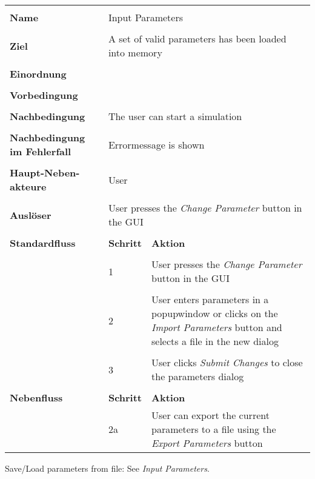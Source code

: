 {\begin{tabular}{|p{5cm}|p{2cm}|p{3cm}|}
\hline \\
\textbf{Name} & \multicolumn{2}{p{5cm}|}{Input Parameters} \\
\hline \\
\textbf{Ziel} & \multicolumn{2}{p{5cm}|}{A set of valid parameters has been loaded into memory} \\
\hline \\
\textbf{Einordnung} & \multicolumn{2}{p{5cm}|}{} \\
\hline \\
\textbf{Vorbedingung} & \multicolumn{2}{p{5cm}|}{} \\
\hline \\
\textbf{Nachbedingung} & \multicolumn{2}{p{5cm}|}{The user can start a simulation} \\
\hline \\
\textbf{Nachbedingung im Fehlerfall} & \multicolumn{2}{p{5cm}|}{Errormessage is shown}\\
\hline \\
\textbf{Haupt-Neben-akteure} & \multicolumn{2}{p{5cm}|}{User} \\
\hline \\
\textbf{Ausl\"oser} & \multicolumn{2}{p{5cm}|}{User presses the \textit{Change Parameter} button in the GUI} \\
\hline \\
\textbf{Standardfluss} & \textbf{Schritt}& \textbf{Aktion} \\
\hline \\
& 1 & User presses the \textit{Change Parameter} button in the GUI \\
\hline \\
& 2 & User enters parameters in a popupwindow or clicks on the \textit{Import Parameters} button and selects a file in the new dialog \\
\hline \\
& 3 & User clicks \textit{Submit Changes} to close the parameters dialog\\
\hline \\
\textbf{Nebenfluss} & \textbf{Schritt} & \textbf{Aktion} \\
& 2a & User can export the current parameters to a file using the \textit{Export Parameters} button\\
\hline
\end{tabular}
\medskip

Save/Load parameters from file: See \textit{Input Parameters}.
\medskip

}
